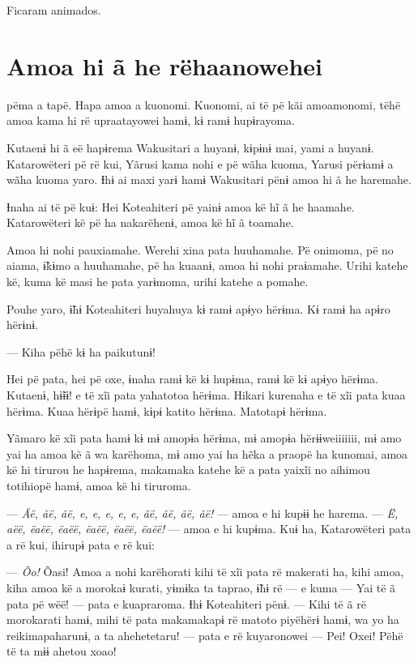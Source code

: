 Ficaram animados.

\chapter[Amoa hi ã he rë haanowehei]{Amoa hi ã he rë\break haanowehei}

 pëma a tapë. Hapa amoa a kuonomi. Kuonomi, ai të pë kãi amoamonomi,
tëhë amoa kama hi rë upraatayowei hamɨ, kɨ ramɨ hupɨrayoma. 

Kutaenɨ hi ã eë hapɨrema Wakusitari a huyanɨ, kɨpɨnɨ mai, yami a huyanɨ.
Katarowëteri pë rë kui, Yãrusi kama nohi e pë wãha kuoma, Yarusi përɨamɨ
a wãha kuoma yaro. Ɨhɨ ai maxi yarɨ hamɨ Wakusitari pënɨ amoa hi ã he
haremahe.

Ɨnaha ai të pë kuɨ: Hei Koteahiteri pë yainɨ amoa kë hĩ ã he haamahe.
Katarowëteri kë pë ha nakarëhenɨ, amoa kë hĩ ã toamahe. 

Amoa hi nohi pauxiamahe. Werehi xina pata huuhamahe. Pë onimoma, pë no
aiama, ɨ̃kɨmo a huuhamahe, pë ha kuaanɨ, amoa hi nohi praɨamahe. Urihi
katehe kë, kuma kë masi he pata yarɨmoma, urihi katehe a pomahe. 

Pouhe yaro, ɨ̃hɨ Koteahiteri huyahuya kɨ ramɨ apɨyo hërɨma. Kɨ ramɨ ha
apɨro hërɨnɨ. 

--- Kiha pëhë kɨ ha paikutunɨ! 

Hei pë pata, hei pë oxe, ɨnaha ramɨ kë kɨ hupɨma, ramɨ kë kɨ apɨyo
hërɨma. Kutaenɨ, hɨ̃ɨɨ! e të xĩi pata yahatotoa hërɨma. Hikari kurenaha e
të xĩi pata kuaa hërɨma. Kuaa hërɨpë hamɨ, kɨpɨ katito hërɨma. Matotapɨ
hërɨma. 

Yãmaro kë xĩi pata hamɨ kɨ mɨ amopɨa hërɨma, mɨ amopɨa hërɨɨweiiiiiii,
mɨ amo yai ha amoa kë ã wa karëhoma, mɨ amo yai ha hẽka a praopë ha
kunomai, amoa kë hi tirurou he hapɨrema, makamaka katehe kë a pata
yaixĩi no aihimou totihiopë hamɨ, amoa kë hi tiruroma. 

--- \textit{Ãë, ãë, ãë, e, e, e, e, e, ãë, ãë, ãë, ãë!} --- amoa e hi kupɨɨ he
harema. --- \textit{Ë, aëë, ëaëë, ëaëë, ëaëë, ëaëë, ëaëë!} --- amoa e hi kupɨma.
Kuɨ ha, Katarowëteri pata a rë kui, ihirupɨ pata e rë kui: 

--- \textit{Õo!} Õasi! Amoa a nohi karëhorati kihi të xĩi pata rë makerati ha,
kihi amoa, kiha amoa kë a morokaɨ kurati, yɨmɨka ta taprao, ɨ̃hɨ rë --- e
kuma --- Yai të ã pata pë wëë! --- pata e kuapraroma. Ɨhɨ Koteahiteri
pënɨ. --- Kihi të ã rë morokarati hamɨ, mihi të pata makamakapɨ rë
matoto piyëhërɨ hamɨ, wa yo ha reikimapaharunɨ, a ta ahehetetaru! ---
pata e rë kuyaronowei --- Pei! Oxei! Pëhë të ta mɨɨ ahetou xoao! 

